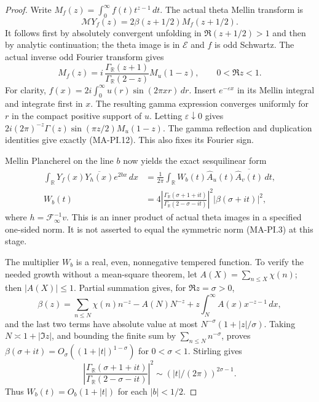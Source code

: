 \begin{proof}
Write $M_f(z)=\int_0^\infty f(t)t^{z-1}\,dt$.
The actual theta Mellin transform is
\[
 \mathcal M Y_f(z)=2\beta(z+1/2)M_f(z+1/2).
 \tag{MA-PI.11}
\]
It follows first by absolutely convergent unfolding in
$\Re(z+1/2)>1$ and then by analytic continuation; the
theta image is in $\mathcal E$ and $f$ is odd Schwartz.
The actual inverse odd Fourier transform gives
\[
 M_f(z)=i\,\frac{\Gamma_{\mathbb R}(z+1)}
                       {\Gamma_{\mathbb R}(2-z)}M_u(1-z),
 \qquad 0<\Re z<1.
 \tag{MA-PI.12}
\]
For clarity, $f(x)=2i\int_0^\infty u(r)\sin(2\pi xr)\,dr$.
Insert $e^{-\varepsilon x}$ in its Mellin integral and
integrate first in $x$.  The resulting gamma expression
converges uniformly for $r$ in the compact positive
support of $u$.  Letting $\varepsilon\downarrow0$ gives
$2i(2\pi)^{-z}\Gamma(z)\sin(\pi z/2)M_u(1-z)$.
The gamma reflection and duplication identities give
exactly (MA-PI.12).  This also fixes its Fourier sign.

Mellin Plancherel on the line $b$ now yields the exact
sesquilinear form
\[
\begin{split}
 \int_{\mathbb R}Y_f(x)\overline{Y_h(x)}e^{2bx}\,dx
   &=\frac1{2\pi}\int_{\mathbb R}
             W_b(t)\widehat A_u(t)
                         \overline{\widehat A_v(t)}\,dt,\\
 W_b(t)&=4\left|
       \frac{\Gamma_{\mathbb R}(\sigma+1+it)}
            {\Gamma_{\mathbb R}(2-\sigma-it)}
                         \right|^2|\beta(\sigma+it)|^2,
\end{split}
 \tag{MA-PI.13}
\]
where $h=\mathcal F_\infty^{-1}v$.
This is an inner product of actual theta images in a
specified one-sided norm.  It is not asserted to equal
the symmetric norm (MA-PI.3) at this stage.

The multiplier $W_b$ is a real, even, nonnegative tempered
function.  To verify the needed growth without a
mean-square theorem, let $A(X)=\sum_{n\leq X}\chi(n)$;
then $|A(X)|\leq1$.  Partial summation gives, for
$\Re z=\sigma>0$,
\[
 \beta(z)=\sum_{n\leq N}\chi(n)n^{-z}
               -A(N)N^{-z}+z\int_N^\infty A(x)x^{-z-1}\,dx,
 \tag{MA-PI.14}
\]
and the last two terms have absolute value at most
$N^{-\sigma}(1+|z|/\sigma)$.  Taking
$N\asymp1+|\Im z|$, and bounding the finite sum by
$\sum_{n\leq N}n^{-\sigma}$, proves
$\beta(\sigma+it)=O_\sigma((1+|t|)^{1-\sigma})$
for $0<\sigma<1$.  Stirling gives
\[
 \left|
       \frac{\Gamma_{\mathbb R}(\sigma+1+it)}
            {\Gamma_{\mathbb R}(2-\sigma-it)}\right|^2
       \sim (|t|/(2\pi))^{2\sigma-1}.
 \tag{MA-PI.15}
\]
Thus $W_b(t)=O_b(1+|t|)$ for each $|b|<1/2$.


\end{proof}
